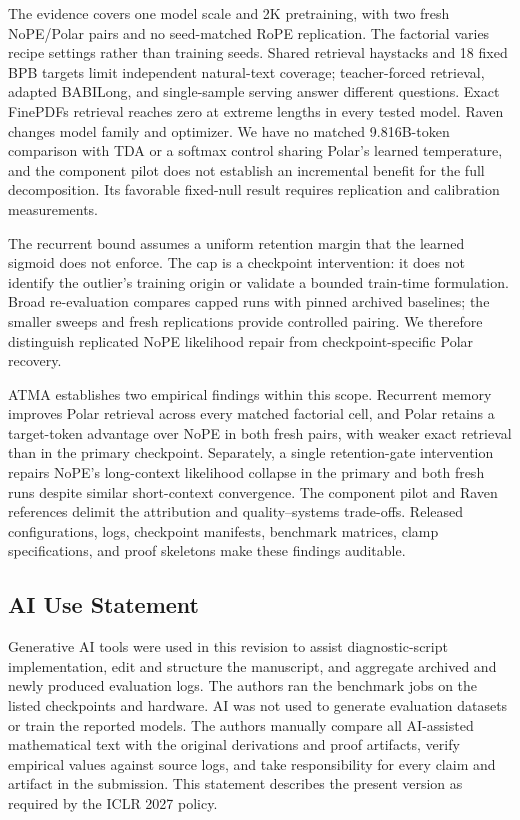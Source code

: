\documentclass{article}
\begin{document}
The evidence covers one model scale and 2K pretraining, with two fresh NoPE/Polar pairs and no seed-matched RoPE replication. The factorial varies recipe settings rather than training seeds. Shared retrieval haystacks and 18 fixed BPB targets limit independent natural-text coverage; teacher-forced retrieval, adapted BABILong, and single-sample serving answer different questions. Exact FinePDFs retrieval reaches zero at extreme lengths in every tested model. Raven changes model family and optimizer. We have no matched 9.816B-token comparison with TDA or a softmax control sharing Polar's learned temperature, and the component pilot does not establish an incremental benefit for the full decomposition. Its favorable fixed-null result requires replication and calibration measurements.

The recurrent bound assumes a uniform retention margin that the learned sigmoid does not enforce. The cap is a checkpoint intervention: it does not identify the outlier's training origin or validate a bounded train-time formulation. Broad re-evaluation compares capped runs with pinned archived baselines; the smaller sweeps and fresh replications provide controlled pairing. We therefore distinguish replicated NoPE likelihood repair from checkpoint-specific Polar recovery.

ATMA establishes two empirical findings within this scope. Recurrent memory improves Polar retrieval across every matched factorial cell, and Polar retains a target-token advantage over NoPE in both fresh pairs, with weaker exact retrieval than in the primary checkpoint. Separately, a single retention-gate intervention repairs NoPE's long-context likelihood collapse in the primary and both fresh runs despite similar short-context convergence. The component pilot and Raven references delimit the attribution and quality--systems trade-offs. Released configurations, logs, checkpoint manifests, benchmark matrices, clamp specifications, and proof skeletons make these findings auditable.

\clearpage
\subsection*{AI Use Statement}
Generative AI tools were used in this revision to assist diagnostic-script implementation, edit and structure the manuscript, and aggregate archived and newly produced evaluation logs. The authors ran the benchmark jobs on the listed checkpoints and hardware. AI was not used to generate evaluation datasets or train the reported models. The authors manually compare all AI-assisted mathematical text with the original derivations and proof artifacts, verify empirical values against source logs, and take responsibility for every claim and artifact in the submission. This statement describes the present version as required by the ICLR 2027 policy.
\end{document}
